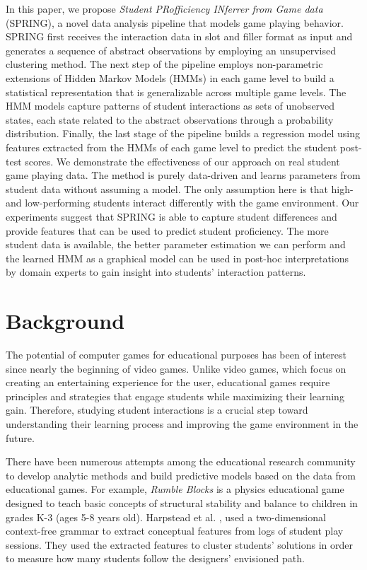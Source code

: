 \documentclass{sigchi}
\def\algname{SPRING\xspace}
\begin{document}
In this paper, we propose \textit{Student PRofficiency INferrer from Game data} (SPRING), a novel data analysis pipeline that models game playing behavior.
\algname first receives the interaction data in slot and filler format as input and generates a sequence of abstract observations by employing an unsupervised clustering method. 
The next step of the pipeline employs non-parametric extensions of Hidden Markov Models (HMMs) in each game level to build a statistical representation that is generalizable across multiple game levels. 
The HMM models capture patterns of student interactions as sets of unobserved states, each state related to the abstract observations through a probability distribution. 
Finally, the last stage of the pipeline builds a regression model using features extracted from the HMMs of each game level to predict the student post-test scores.
We demonstrate the effectiveness of our approach on real student game playing data.
The method is purely data-driven and learns parameters from student data without assuming a model. 
The only assumption here is that high- and low-performing students interact differently with the game environment.
Our experiments suggest that \algname is able to capture student differences and provide features that can be used to predict student proficiency.
The more student data is available, the better parameter estimation we can perform and the learned HMM as a graphical model can be used in post-hoc interpretations by domain experts to gain insight into students' interaction patterns.

\section{Background}
The potential of computer games for educational purposes has been of interest since nearly the beginning of video games. Unlike video games, which focus on creating an entertaining experience for the user, educational games require principles and strategies that engage students while maximizing their learning gain. Therefore, studying student interactions is a crucial step toward understanding their learning process and improving the game environment in the future.

There have been numerous attempts among the educational research community to develop analytic methods and build predictive models based on the data from educational games. For example, \textit {Rumble Blocks} \cite{harpstead2014using} is a physics educational game designed to teach basic concepts of structural stability and balance to children in grades K-3 (ages 5-8 years old). Harpstead et al. \cite{harpstead2013investigating}, used a two-dimensional context-free grammar to extract conceptual features from  logs of student play sessions. They used the extracted features to cluster students' solutions in order to measure how many students follow the designers’ envisioned path.
\end{document}
